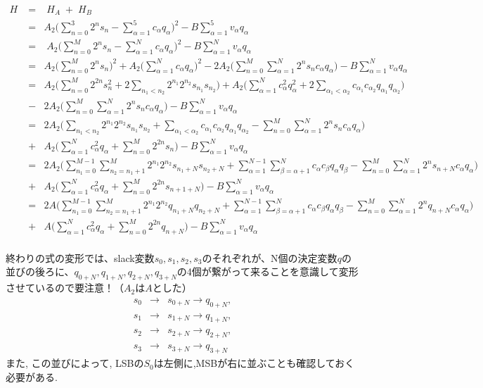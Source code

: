 \documentclass[uplatex,dvipdfmx,a4paper,11pt,oneside,openany]{jsbook}
\begin{document}
\begin{eqnarray*}
  H\;&=&\;H_A\;+\;H_B\\
  &=&A_2\bigg(\sum_{n=0}^{3}2^n s_n- \sum_{\alpha=1}^{5}c_\alpha q_\alpha\bigg)^2 - B\sum_{\alpha=1}^{5}v_\alpha q_\alpha\\
&=&\;A_2\bigg(\sum_{n=0}^{M}2^n s_n - \sum_{\alpha=1}^{N}c_\alpha q_\alpha\bigg)^2 - B\sum_{\alpha=1}^{N}v_\alpha q_\alpha\\
&=&A_2\bigg(\sum_{n=0}^{M}2^n s_n\bigg)^2 + A_2\bigg(\sum_{\alpha=1}^{N}c_\alpha q_\alpha\bigg)^2 - 2A_2\bigg(\sum_{n=0}^{M}\sum_{\alpha=1}^{N}2^n s_n c_\alpha q_\alpha\bigg) - B\sum_{\alpha=1}^{N}v_\alpha q_\alpha\\
&=&A_2\bigg(\sum_{n=0}^M2^{2n}s_n^2 + 2\sum_{n_1<n_2}2^{n_1}2^{n_2}s_{n_1}s_{n_2}\bigg) + A_2\bigg(\sum_{\alpha=1}^Nc_\alpha^2q_\alpha^2 + 2\sum_{\alpha_1<\alpha_2}c_{\alpha_1} c_{\alpha_2} q_{\alpha_1} q_{\alpha_2}\bigg)\\
&-& 2A_2\bigg(\sum_{n=0}^{M}\sum_{\alpha=1}^{N}2^n s_n c_\alpha q_\alpha\bigg) - B\sum_{\alpha=1}^{N}v_\alpha q_\alpha\\
&=&2A_2\bigg(\sum_{n_1<n_2}2^{n_1}2^{n_2}s_{n_1}s_{n_2} + \sum_{\alpha_1<\alpha_2}c_{\alpha_1} c_{\alpha_2} q_{\alpha_1} q_{\alpha_2} - \sum_{n=0}^{M}\sum_{\alpha=1}^{N}2^n s_n c_\alpha q_\alpha\bigg)\\
&+& A_2\bigg(\sum_{\alpha=1}^Nc_\alpha^2q_\alpha + \sum_{n=0}^M2^{2n}s_n\bigg) - B\sum_{\alpha=1}^{N}v_\alpha q_\alpha\\
&=&2A_2\bigg(\sum_{n_1=0}^{M-1}\sum_{n_2=n_1+1}^{M}2^{n_1}2^{n_2}s_{n_1+N}s_{n_2+N} + \sum_{\alpha=1}^{N-1}\sum_{\beta=\alpha+1}^N c_\alpha c_\beta q_\alpha q_\beta - \sum_{n=0}^M\sum_{\alpha=1}^N 2^n s_{n+N}c_\alpha q_\alpha \bigg)\\
&+& A_2\bigg(\sum_{\alpha=1}^N c_\alpha^2 q_\alpha + \sum_{n=0}^M 2^{2n}s_{n+1+N}\bigg) - B\sum_{\alpha=1}^N v_\alpha q_\alpha\\
&=&2A\bigg(\sum_{n_1=0}^{M-1}\sum_{n_2=n_1+1}^{M}2^{n_1}2^{n_2}q_{n_1+N}q_{n_2+N} + \sum_{\alpha=1}^{N-1}\sum_{\beta=\alpha+1}^N c_\alpha c_\beta q_\alpha q_\beta - \sum_{n=0}^M\sum_{\alpha=1}^N 2^n q_{n+N}c_\alpha q_\alpha \bigg)\\
&+& A\bigg(\sum_{\alpha=1}^N c_\alpha^2 q_\alpha + \sum_{n=0}^M 2^{2n}q_{n+N}\bigg) - B\sum_{\alpha=1}^N v_\alpha q_\alpha\\
\end{eqnarray*}

終わりの式の変形では、slack変数$s_0, s_1, s_2, s_3$のそれぞれが、N個の決定変数$q$の並びの後ろに、$q_{0+N}, q_{1+N}, q_{2+N}, q_{3+N}$の4個が繋がって来ることを意識して変形させているので要注意！（$A_2$は$A$とした）
\begin{eqnarray*}
s_0&\rightarrow& s_{0+N}\rightarrow q_{0+N},\\
s_1&\rightarrow& s_{1+N}\rightarrow q_{1+N},\\
s_2&\rightarrow& s_{2+N}\rightarrow q_{2+N},\\
s_3&\rightarrow& s_{3+N}\rightarrow q_{3+N}
\end{eqnarray*}
また, この並びによって, LSBの$S_0$は左側に,MSBが右に並ぶことも確認しておく必要がある.
\end{document}

